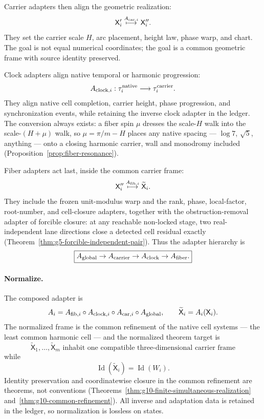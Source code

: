 \documentclass[11pt]{article}
\theoremstyle{definition}
\begin{document}
Carrier adapters then align the geometric realization:
\[
\mathsf X_i'
\overset{A_{{\rm car},i}}{\longmapsto}
\mathsf X_i''.
\]
They set the carrier scale \(H\), arc placement, height law, phase warp, and
chart.  The goal is not equal numerical coordinates; the goal is a common
geometric frame with source identity preserved.

Clock adapters align native temporal or harmonic progression:
\[
A_{{\rm clock},i}:\tau_i^{\rm native}\longrightarrow\tau_i^{\rm carrier}.
\]
They align native cell completion, carrier height, phase progression, and
synchronization events, while retaining the inverse clock adapter in the
ledger.  The conversion always exists: a fiber spin \(\mu\) dresses the
scale-\(H\) walk into the scale-\((H{+}\mu)\) walk, so \(\mu=\pi/m-H\) places
any native spacing --- \(\log 7\), \(\sqrt5\), anything --- onto a closing
harmonic carrier, wall and monodromy included
(Proposition~\ref{prop:fiber-resonance}).

Fiber adapters act last, inside the common carrier frame:
\[
\mathsf X_i''
\overset{A_{{\rm fib},i}}{\longmapsto}
\widetilde{\mathsf X}_i.
\]
They include the frozen unit-modulus warp and the rank, phase, local-factor,
root-number, and cell-closure adapters, together with the obstruction-removal
adapter of forcible closure: at any reachable non-locked stage, two
real-independent lane directions close a detected cell residual exactly
(Theorem~\ref{thm:g5-forcible-independent-pair}).  Thus the adapter hierarchy
is
\[
\boxed{
A_{\rm global}
\to
A_{\rm carrier}
\to
A_{\rm clock}
\to
A_{\rm fiber}.
}
\]

\paragraph{Normalize.}
The composed adapter is
\[
A_i
=
A_{{\rm fib},i}
\circ
A_{{\rm clock},i}
\circ
A_{{\rm car},i}
\circ
A_{\rm global},
\qquad
\widetilde{\mathsf X}_i=A_i(\mathsf X_i).
\]
The normalized frame is the common refinement of the native cell systems ---
the least common harmonic cell --- and the normalized theorem target is
\[
\boxed{
\widetilde{\mathsf X}_1,\ldots,\widetilde{\mathsf X}_m
\text{ inhabit one compatible three-dimensional carrier frame}
}
\]
while
\[
\operatorname{Id}(\widetilde{\mathsf X}_i)=\operatorname{Id}(W_i).
\]
Identity preservation and coordinatewise closure in the common refinement are
theorems, not conventions
(Theorems~\ref{thm:g10-finite-simultaneous-realization}
and~\ref{thm:g10-common-refinement}).  All inverse and adaptation data is
retained in the ledger, so normalization is lossless on states.
\end{document}
